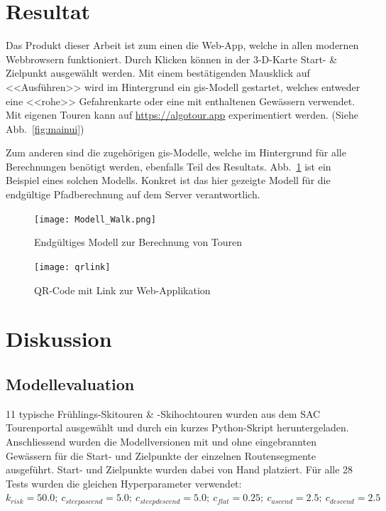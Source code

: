 \section{Resultat}

Das Produkt dieser Arbeit ist zum einen die Web-App, welche in allen modernen Webbrowsern funktioniert. Durch Klicken können in der 3-D-Karte Start- \& Zielpunkt ausgewählt werden. Mit einem bestätigenden Mausklick auf <<Ausführen>> wird im Hintergrund ein \gls{gis}-Modell gestartet, welches entweder eine <<rohe>> Gefahrenkarte oder eine mit enthaltenen Gewässern verwendet. Mit eigenen Touren kann auf \url{https://algotour.app} experimentiert werden. (Siehe Abb.\ \ref{fig:mainui})

Zum anderen sind die zugehörigen \acrshort{gis}-Modelle, welche im Hintergrund für alle Berechnungen benötigt werden, ebenfalls Teil des Resultats. Abb.\ \ref{fig:walkmodel} ist ein Beispiel eines solchen Modells. Konkret ist das hier gezeigte Modell für die endgültige Pfadberechnung auf dem Server verantwortlich.

\begin{figure}[H]
  \centering
  \texttt{[image: Modell\_Walk.png]}
  \caption{Endgültiges Modell zur Berechnung von Touren}\label{fig:walkmodel}
\end{figure}
\begin{figure}[H]
  \centering
  \texttt{[image: qrlink]}
  \caption{QR-Code mit Link zur Web-Applikation}\label{fig:qrlink}
\end{figure}


\clearpage
\section{Diskussion}

\subsection{Modellevaluation}

11 typische Frühlings-Skitouren \& -Skihochtouren wurden aus dem SAC Tourenportal ausgewählt und durch ein kurzes Python-Skript heruntergeladen. Anschliessend wurden die Modellversionen mit und ohne eingebrannten Gewässern für die Start- und Zielpunkte der einzelnen Routensegmente ausgeführt. Start- und Zielpunkte wurden dabei von Hand platziert. Für alle 28 Tests wurden die gleichen Hyperparameter verwendet: \\$k_{risk}={50.0};\ c_{steepascend}={5.0};\ c_{steepdescend}={5.0};\ c_{flat}={0.25};\ c_{ascend}={2.5};\ c_{descend}={2.5}$


